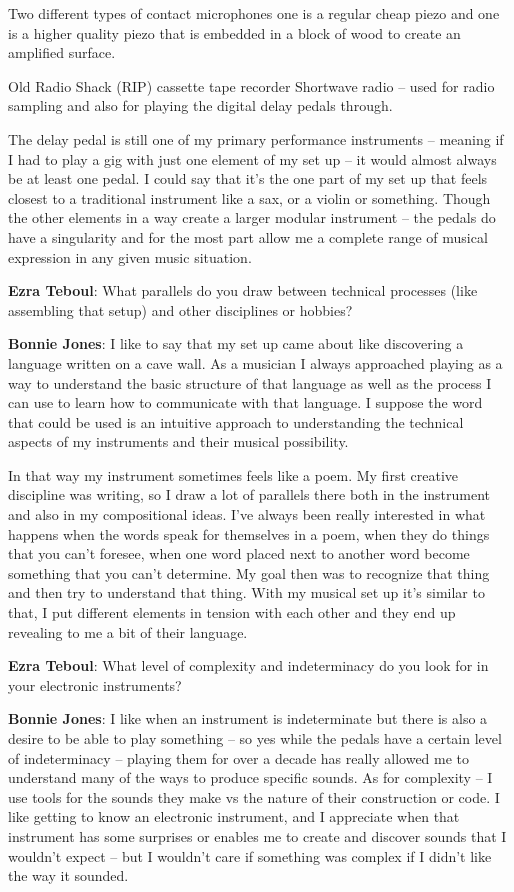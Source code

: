 Two different types of contact microphones one is a regular cheap piezo and one is a higher quality piezo that is embedded in a block of wood to create an amplified surface. 

Old Radio Shack (RIP) cassette tape recorder Shortwave radio – used for radio sampling and also for playing the digital delay pedals through. 

The delay pedal is still one of my primary performance instruments – meaning if I had to play a gig with just one element of my set up – it would almost always be at least one pedal. I could say that it’s the one part of my set up that feels closest to a traditional instrument like a sax, or a violin or something. Though the other elements in a way create a larger modular instrument – the pedals do have a singularity and for the most part allow me a complete range of musical expression in any given music situation. 

\textbf{Ezra Teboul}: What parallels do you draw between technical processes (like assembling that setup) and other disciplines or hobbies? 

\textbf{Bonnie Jones}: I like to say that my set up came about like discovering a language written on a cave wall. As a musician I always approached playing as a way to understand the basic structure of that language as well as the process I can use to learn how to communicate with that language. I suppose the word that could be used is an intuitive approach to understanding the technical aspects of my instruments and their musical possibility. 

In that way my instrument sometimes feels like a poem. My first creative discipline was writing, so I draw a lot of parallels there both in the instrument and also in my compositional ideas. I’ve always been really interested in what happens when the words speak for themselves in a poem, when they do things that you can’t foresee, when one word placed next to another word become something that you can’t determine. My goal then was to recognize that thing and then try to understand that thing. With my musical set up it’s similar to that, I put different elements in tension with each other and they end up revealing to me a bit of their language.

\textbf{Ezra Teboul}: What level of complexity and indeterminacy do you look for in your electronic instruments? 

\textbf{Bonnie Jones}: I like when an instrument is indeterminate but there is also a desire to be able to play something – so yes while the pedals have a certain level of indeterminacy – playing them for over a decade has really allowed me to understand many of the ways to produce specific sounds. As for complexity – I use tools for the sounds they make vs the nature of their construction or code. I like getting to know an electronic instrument, and I appreciate when that instrument has some surprises or enables me to create and discover sounds that I wouldn’t expect – but I wouldn’t care if something was complex if I didn’t like the way it sounded. 


